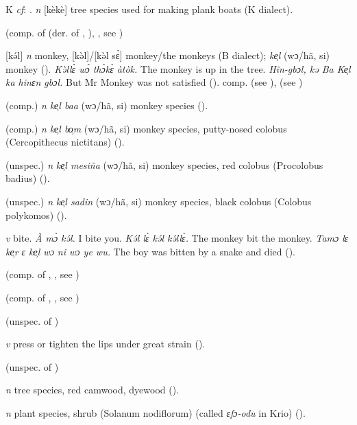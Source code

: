 \begin{letter}{K}
 \textit{cf}: . \textit{n} [kèkè] tree species used for making plank boats (K dialect). 

 (comp. of  (der. of , ), , see ) 

 [kə́l] \textit{n} monkey, [kə̀l]/[kə̀l sɛ̀] monkey/the monkeys (B dialect); \textit{ke̹l} (wɔ/hã, si) monkey (\citealt{Pichl1967}). \textit{Kə̀llɛ̀ wɔ́ thɔ̀kɛ̀ àtòk.} The monkey is up in the tree. \textit{Hĩn-gbɔl, kə Ba Ke̹l ka hinɛn gbɔl.} But Mr Monkey was not satisfied (\citealt{Pichl1967}). comp.  (see ),  (see ) 

 (comp.) \textit{n} \textit{ke̹l baa} (wɔ/hã, si) monkey species (\citealt{Pichl1967}). 

 (comp.) \textit{n} \textit{ke̹l bo̹m} (wɔ/hã, si) monkey species, putty-nosed colobus (Cercopithecus nictitans) (\citealt{Pichl1967}). 

 (unspec.) \textit{n} \textit{ke̹l mesiña} (wɔ/hã, si) monkey species, red colobus (Procolobus badius) (\citealt{Pichl1967}). 

 (unspec.) \textit{n} \textit{ke̹l sadin} (wɔ/hã, si) monkey species, black colobus (Colobus polykomos) (\citealt{Pichl1967}). 

 \textit{v} bite. \textit{À mɔ̀ kə́l.} I bite you. \textit{Kə́l lɛ̀ kə́l kə́llɛ̀.} The monkey bit the monkey. \textit{Tamɔ lɛ ke̹r ɛ ke̹l wɔ ni wɔ ye wu.} The boy was bitten by a snake and died (\citealt{Pichl1967}). 

 (comp. of , , see ) 

 (comp. of , , see ) 

 (unspec. of ) 

 \textit{v} press or tighten the lips under great strain (\citealt{Pichl1967}). 

 (unspec. of ) 

 \textit{n} tree species, red camwood, dyewood (\citealt{Pichl1967}). 

 \textit{n} plant species, shrub (Solanum nodiflorum) (called \textit{ɛfɔ-odu} in Krio) (\citealt{Pichl1967}). 


\end{letter}
